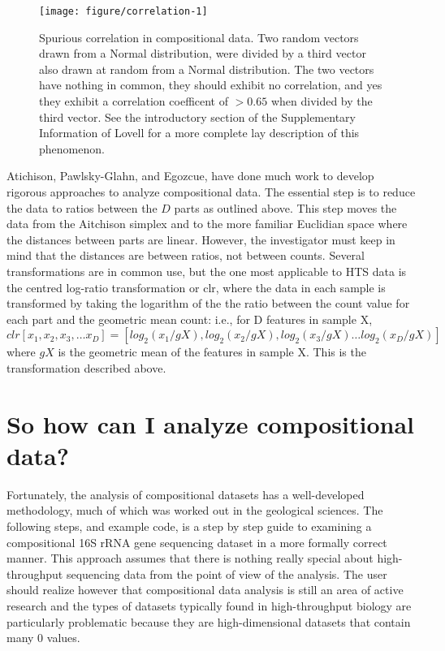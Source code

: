 \documentclass[11pt]{article}\usepackage[]{graphicx}\usepackage[]{color}
\makeatletter
\def\maxwidth{ %
  \ifdim\Gin@nat@width>\linewidth
    \linewidth
  \else
    \Gin@nat@width
  \fi
}
\newenvironment{knitrout}{}{} %
\makeatother
\begin{document}
\begin{figure}
\begin{center}

\begin{knitrout}
\color{fgcolor}
\texttt{[image: figure/correlation-1]} 

\end{knitrout}
\caption{Spurious correlation in compositional data. Two random vectors drawn from a Normal distribution, were divided by a third vector also drawn at random from a Normal distribution. The two vectors have nothing in common, they should exhibit  no correlation, and yes they exhibit a correlation coefficent of $>0.65$ when divided by the third vector. See the introductory section of the Supplementary Information of Lovell\cite{Lovell:2015aa} for a more complete lay description of this phenomenon.  }
\label{correlation}
\end{center}
\end{figure}


Atichison\cite{Aitchison:1986}, Pawlsky-Glahn\cite{Pawlowsky-Glahn:2006}, and Egozcue\cite{egozcue2005}, have done much work to develop rigorous approaches to analyze compositional data\cite{pawlowsky2011compositional}. The essential step is to reduce the data to ratios between the $D$ parts as outlined above. This step moves the data from the Aitchison simplex and to the more familiar Euclidian space where the distances between parts are linear. However, the investigator must keep in mind that the distances are between ratios, not between counts. Several transformations are in common use, but the one most applicable to HTS data is the centred log-ratio transformation or clr, where the data in each sample is transformed by taking the logarithm of the the ratio between the count value for each part and the geometric mean count: i.e., for D features in sample X, $clr [x_1, x_2, x_3, \ldots x_D] = [log_2(x_1/gX), log_2(x_2/gX), log_2(x_3/gX) \ldots log_2(x_D/gX)]$ where $gX$ is the geometric mean of the features in sample X. This is the transformation described above.


\section{So how can I analyze compositional data?}

Fortunately, the analysis of compositional datasets has a well-developed methodology, much of which was worked out in the geological sciences. The following steps, and example code, is a step by step guide to examining a compositional 16S rRNA gene sequencing dataset in a more formally correct manner. This approach assumes that there is nothing really special about high-throughput sequencing data from the point of view of the analysis. The user should realize however that compositional data analysis is still an area of active research and the types of datasets typically found in high-throughput biology are particularly problematic because they are  high-dimensional datasets that contain many 0 values.
\end{document}
